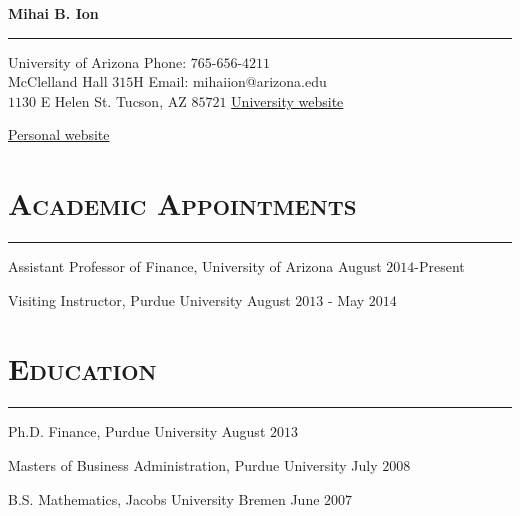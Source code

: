 \documentclass[10pt,letterpaper]{article}
\def\name{Mihai B. Ion}
\renewenvironment{itemize}{
  \begin{list}{}{
    \setlength{\leftmargin}{1.5em}
    \setlength{\itemsep}{0.25em}
    \setlength{\parskip}{0pt}
    \setlength{\parsep}{0.25em}
  }
}{
  \end{list}
}
\begin{document}

\centerline{\huge \bf \name}
\vspace{-3mm}
\rule{\textwidth}{0.5mm}

\medskip
  University of Arizona \hfill   Phone: $765$-$656$-$4211$ \\
 McClelland Hall $315$H \hfill   Email: mihaiion@arizona.edu \\
 $1130$ E Helen St. Tucson, AZ $85721$ \hfill   \href{https://finance.eller.arizona.edu/people/mihai-ion}{University website}
\vspace{-0.2cm}
 \begin{flushright}
    \href{https://ionmihai.github.io}{Personal website} 
 \end{flushright}
  
 










\section*{\textsc{Academic Appointments}}
\nointerlineskip
\vspace{-3mm}
\rule{\textwidth}{0.5mm}

\begin{itemize}
  \item Assistant Professor of Finance, University of Arizona \hfill August $2014$-Present
\item Visiting Instructor, Purdue University \hfill August $2013$ - May $2014$
\end{itemize}











\section*{\textsc{Education}}
\nointerlineskip
\vspace{-3mm}
\rule{\textwidth}{0.5mm}

\begin{itemize}
  \item Ph.D. Finance, Purdue University \hfill August $2013$
  \item Masters of Business Administration, Purdue University \hfill July $2008$
  \item B.S. Mathematics, Jacobs University Bremen \hfill June $2007$
\end{itemize}
\end{document}
